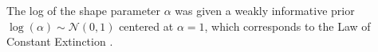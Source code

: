 \documentclass[11pt]{article}
\begin{document}
The log of the shape parameter \(\alpha\) was given a weakly informative prior \(\log(\alpha) \sim \mathcal{N}(0, 1)\) centered at \(\alpha = 1\), which corresponds to the Law of Constant Extinction \citep{VanValen1973}.

%
%
\end{document}

